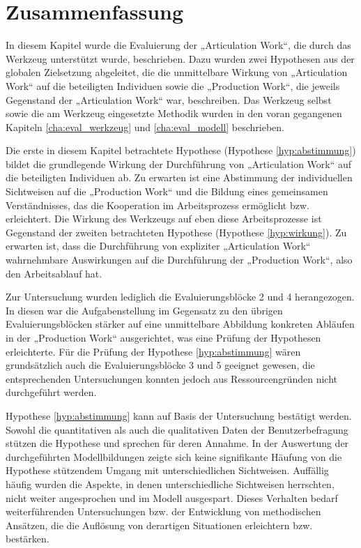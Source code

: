
\section{Zusammenfassung} %
\label{sec:a_zusammenfassung}

In diesem Kapitel wurde die Evaluierung der „Articulation Work“, die durch das Werkzeug unterstützt wurde, beschrieben. Dazu wurden zwei Hypothesen aus der globalen Zielsetzung abgeleitet, die die unmittelbare Wirkung von „Articulation Work“ auf die beteiligten Individuen sowie die „Production Work“, die jeweils Gegenstand der „Articulation Work“ war, beschreiben. Das Werkzeug selbst sowie die am Werkzeug eingesetzte Methodik wurden in den voran gegangenen Kapiteln \ref{cha:eval_werkzeug} und \ref{cha:eval_modell} beschrieben.

Die erste in diesem Kapitel betrachtete Hypothese (Hypothese \ref{hyp:abstimmung}) bildet die grundlegende Wirkung der Durchführung von „Articulation Work“ auf die beteiligten Individuen ab. Zu erwarten ist eine Abstimmung der individuellen Sichtweisen auf die „Production Work“ und die Bildung eines gemeinsamen Verständnisses, das die Kooperation im Arbeitsprozess ermöglicht bzw. erleichtert. Die Wirkung des Werkzeugs auf eben diese Arbeitsprozesse ist Gegenstand der zweiten betrachteten Hypothese (Hypothese \ref{hyp:wirkung}). Zu erwarten ist, dass die Durchführung von expliziter „Articulation Work“ wahrnehmbare Auswirkungen auf die Durchführung der „Production Work“, also den Arbeitsablauf hat.

Zur Untersuchung wurden lediglich die Evaluierungsblöcke 2 und 4 herangezogen. In diesen war die Aufgabenstellung im Gegensatz zu den übrigen Evaluierungsblöcken stärker auf eine unmittelbare Abbildung konkreten Abläufen in der „Production Work“ ausgerichtet, was eine Prüfung der Hypothesen erleichterte. Für die Prüfung der Hypothese \ref{hyp:abstimmung} wären grundsätzlich auch die Evaluierungsblöcke 3 und 5 geeignet gewesen, die entsprechenden Untersuchungen konnten jedoch aus Ressourcengründen nicht durchgeführt werden.

Hypothese \ref{hyp:abstimmung} kann auf Basis der Untersuchung bestätigt werden. Sowohl die quantitativen als auch die qualitativen Daten der Benutzerbefragung stützen die Hypothese und sprechen für deren Annahme. In der Auswertung der durchgeführten Modellbildungen zeigte sich keine signifikante Häufung von die Hypothese stützendem Umgang mit unterschiedlichen Sichtweisen. Auffällig häufig wurden die Aspekte, in denen unterschiedliche Sichtweisen herrschten, nicht weiter angesprochen und im Modell ausgespart. Dieses Verhalten bedarf weiterführenden Untersuchungen bzw. der Entwicklung von methodischen Ansätzen, die die Auflösung von derartigen Situationen erleichtern bzw. bestärken.

